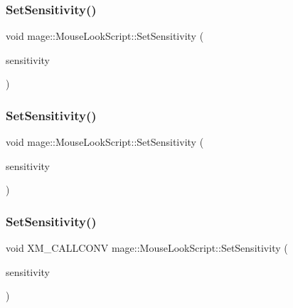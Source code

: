 \hypertarget{classmage_1_1_mouse_look_script_afcdd18f25a8d193e44f82fead1a814fc}{}\label{classmage_1_1_mouse_look_script_afcdd18f25a8d193e44f82fead1a814fc} 
\subsubsection{\texorpdfstring{Set\+Sensitivity()}{SetSensitivity()}\hspace{0.1cm}{\footnotesize\ttfamily [2/4]}}
{\footnotesize\ttfamily void mage\+::\+Mouse\+Look\+Script\+::\+Set\+Sensitivity (\begin{DoxyParamCaption}\item[{const X\+M\+F\+L\+O\+A\+T2 \&}]{sensitivity }\end{DoxyParamCaption})\hspace{0.3cm}{\ttfamily [noexcept]}}

\hypertarget{classmage_1_1_mouse_look_script_a532715b6e11ee72a2bf76866457e69b2}{}\label{classmage_1_1_mouse_look_script_a532715b6e11ee72a2bf76866457e69b2} 
\subsubsection{\texorpdfstring{Set\+Sensitivity()}{SetSensitivity()}\hspace{0.1cm}{\footnotesize\ttfamily [3/4]}}
{\footnotesize\ttfamily void mage\+::\+Mouse\+Look\+Script\+::\+Set\+Sensitivity (\begin{DoxyParamCaption}\item[{X\+M\+F\+L\+O\+A\+T2 \&\&}]{sensitivity }\end{DoxyParamCaption})\hspace{0.3cm}{\ttfamily [noexcept]}}

\hypertarget{classmage_1_1_mouse_look_script_a909c1c584952bd0273972b6c68649e72}{}\label{classmage_1_1_mouse_look_script_a909c1c584952bd0273972b6c68649e72} 
\subsubsection{\texorpdfstring{Set\+Sensitivity()}{SetSensitivity()}\hspace{0.1cm}{\footnotesize\ttfamily [4/4]}}
{\footnotesize\ttfamily void X\+M\+\_\+\+C\+A\+L\+L\+C\+O\+NV mage\+::\+Mouse\+Look\+Script\+::\+Set\+Sensitivity (\begin{DoxyParamCaption}\item[{F\+X\+M\+V\+E\+C\+T\+OR}]{sensitivity }\end{DoxyParamCaption})\hspace{0.3cm}{\ttfamily [noexcept]}}

